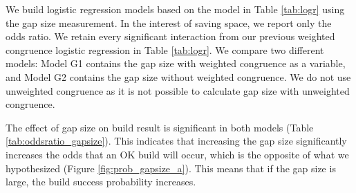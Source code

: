 
We build logistic regression models based on the model in Table \ref{tab:logr} using the gap size measurement. In the interest of saving space, we report only the odds ratio. We retain every significant interaction from our previous weighted congruence logistic regression in Table \ref{tab:logr}.
We compare two different models: Model G1 contains the gap size with weighted congruence as a variable, and Model G2 contains the gap size without weighted congruence.  We do not use unweighted congruence as it is not possible to calculate gap size with unweighted congruence.

The effect of gap size on build result is significant in both models (Table \ref{tab:oddsratio_gapsize}). This indicates that increasing the gap size significantly increases the odds that an OK build will occur, which is the opposite of what we hypothesized (Figure \ref{fig:prob_gapsize_a}). This means that if the gap size is large, the build success probability increases.


